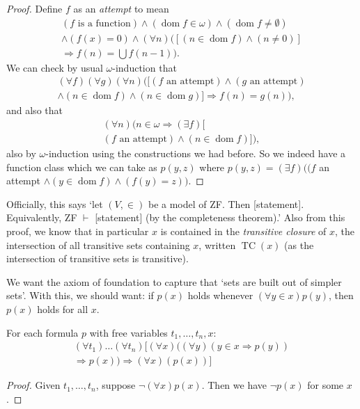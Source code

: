 \documentclass[a3paper, 10pt]{article}
\renewcommand{\vocab}[1]{\emph{#1}}
\newcommand{\dom}{\operatorname{dom}}
\begin{document}
\begin{multicols*}{5}
\begin{proof}
  Define $f$ as an \emph{attempt} to mean
  \begin{align*}
    (f \text{ is a function}) \land (\dom f \in \omega) \land (\dom f \neq \emptyset) \\
    \land  (f(x) = 0) \land (\forall n)([(n \in \dom f) \land (n \neq 0)] \\
    \Rightarrow f(n) = \bigcup f(n - 1)).
  \end{align*}
  We can check by usual $\omega$-induction that
  \begin{align*}
    (\forall f)(\forall g)(\forall n)([(f \text{ an attempt}) \land (g \text{ an attempt}) \\ 
    \land (n \in \dom f) \land (n \in \dom g)] \Rightarrow f(n) = g(n)),
  \end{align*}
  and also that
  \begin{align*}
    (\forall n)(n \in \omega \Rightarrow (\exists f)[\\
    (f \text{ an attempt}) \land (n \in \dom f)]),
  \end{align*}
  also by $\omega$-induction using the constructions we had before. So we indeed have a function class which we can take as $p(y, z)$ where
  $
p(y, z) = (\exists f)((f$ an attempt $\land (y \in \dom f) \land (f(y) = z)).
  $
\end{proof}
\begin{remark}
  Officially, this says `let $(V, \in)$ be a model of ZF. Then [statement]. Equivalently, ZF $\vdash$ [statement] (by the completeness theorem).' Also from this proof, we know that in particular $x$ is contained in the \vocab{transitive closure} of $x$, the intersection of all transitive sets containing $x$, written $\operatorname{TC}(x)$ (as the intersection of transitive sets is transitive).
\end{remark}

We want the axiom of foundation to capture that `sets are built out of simpler sets'. With this, we should want: if $p(x)$ holds whenever $(\forall y \in x) p(y)$, then $p(x)$ holds for all $x$.

\begin{theorem}
  For each formula $p$ with free variables $t_1, \dots, t_n, x$:
  \begin{align*}
  \left(\forall t_1\right) \ldots\left(\forall t_n\right)[(\forall x)((\forall y)(y \in x \Rightarrow p(y)) \\
  \Rightarrow p(x)) \Rightarrow(\forall x)(p(x))]
  \end{align*}
\end{theorem}
\begin{proof}
  Given $t_1, \dots, t_n$, suppose $\lnot (\forall x)p(x)$. Then we have $\lnot p(x)$ for some $x$.


\end{proof}
\end{multicols*}
\end{document}
